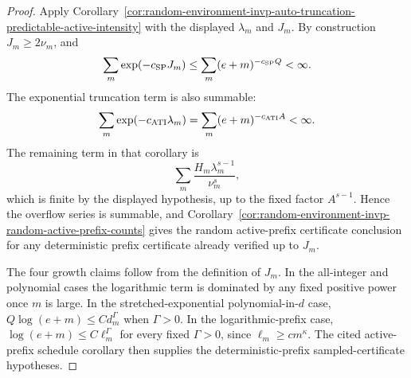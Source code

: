 \documentclass[11pt]{amsart}
\numberwithin{equation}{section}
\theoremstyle{definition}
\theoremstyle{remark}
\begin{document}
\begin{proof}
Apply
Corollary~\ref{cor:random-environment-invp-auto-truncation-predictable-active-intensity}
with the displayed \(\lambda_m\) and \(J_m\).  By construction
\(J_m\ge2\nu_m\), and
\[
  \sum_m\exp(-c_{\rm SP}J_m)
  \le
  \sum_m(e+m)^{-c_{\rm SP}Q}<\infty .
\]
The exponential truncation term is also summable:
\[
  \sum_m\exp(-c_{\rm ATI}\lambda_m)
  =
  \sum_m(e+m)^{-c_{\rm ATI}A}<\infty .
\]
The remaining term in that corollary is
\[
  \sum_m
  \frac{H_m\lambda_m^{s-1}}{\nu_m^s},
\]
which is finite by the displayed hypothesis, up to the fixed factor
\(A^{s-1}\).  Hence the overflow series is summable, and
Corollary~\ref{cor:random-environment-invp-random-active-prefix-counts} gives
the random active-prefix certificate conclusion for any deterministic prefix
certificate already verified up to \(J_m\).

The four growth claims follow from the definition of \(J_m\).  In the
all-integer and polynomial cases the logarithmic term is dominated by any fixed
positive power once \(m\) is large.  In the stretched-exponential
polynomial-in-\(d\) case, \(Q\log(e+m)\le C d_m^\Gamma\) when \(\Gamma>0\).
In the logarithmic-prefix case,
\(\log(e+m)\le C\ell_m^\Gamma\) for every fixed \(\Gamma>0\), since
\(\ell_m\ge c m^\kappa\).  The cited active-prefix schedule corollary then
supplies the deterministic-prefix sampled-certificate hypotheses.
\end{proof}
\end{document}
